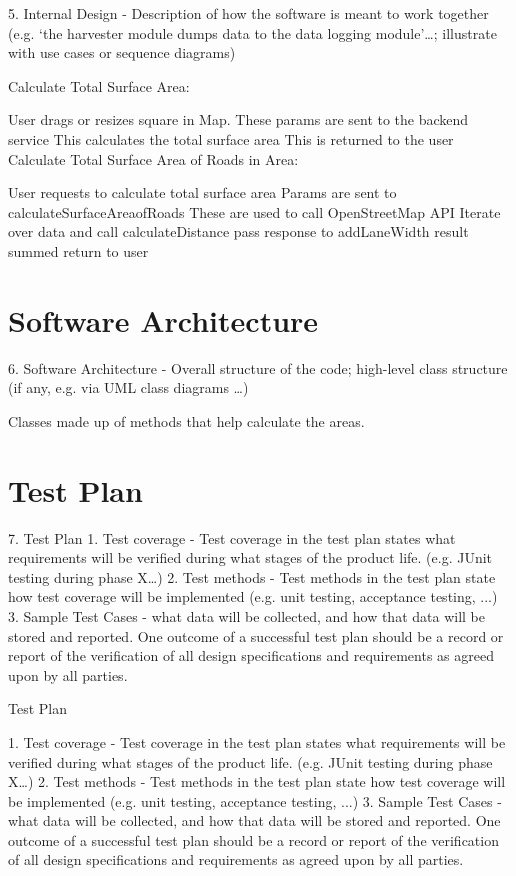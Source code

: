 \documentclass[a4paper,11pt]{article}
\begin{document}
5. Internal Design - Description of how the software is meant to work together (e.g. ‘the harvester module dumps data to the data logging module’…; illustrate with use cases or sequence diagrams)


Calculate Total Surface Area:

User drags or resizes square in Map.
These params are sent to the backend service
This calculates the total surface area
This is returned to the user
Calculate Total Surface Area of Roads in Area:

User requests to calculate total surface area
Params are sent to calculateSurfaceAreaofRoads
These are used to call OpenStreetMap API
Iterate over data and call calculateDistance
pass response to addLaneWidth
result summed
return to user


\section{Software Architecture}

6. Software Architecture - Overall structure of the code; high-level class structure (if any, e.g. via UML class diagrams …)



Classes made up of methods that help calculate the areas.

\section{Test Plan}

7. Test Plan
  1. Test coverage - Test coverage in the test plan states what requirements will be verified during what stages of the product life. (e.g. JUnit testing during phase X…)
  2. Test methods - Test methods in the test plan state how test coverage will be implemented (e.g. unit testing, acceptance testing, ...)
  3. Sample Test Cases - what data will be collected, and how that data will be stored and reported. One outcome of a successful test plan should be a record or report of the verification of all design specifications and requirements as agreed upon by all parties.


Test Plan

1. Test coverage - Test coverage in the test plan states what requirements will be verified during what stages of the product life. (e.g. JUnit testing during phase X…)
2. Test methods - Test methods in the test plan state how test coverage will be implemented (e.g. unit testing, acceptance testing, ...)
3. Sample Test Cases - what data will be collected, and how that data will be stored and reported. One outcome of a successful test plan should be a record or report of the verification of all design specifications and requirements as agreed upon by all parties.
\end{document}
